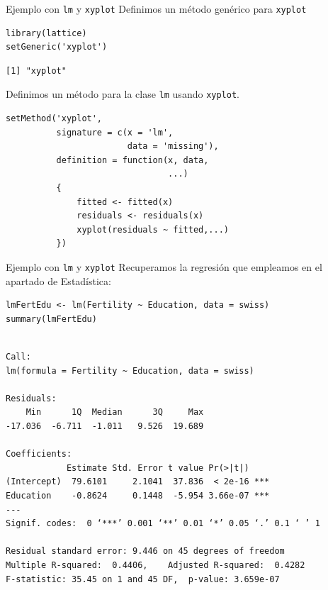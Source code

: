 \documentclass[xcolor={usenames,svgnames,dvipsnames}]{beamer}
\begin{document}
\begin{frame}[label={sec:org7fbee96},fragile]{Ejemplo con \texttt{lm} y \texttt{xyplot}}
 Definimos un método genérico para \texttt{xyplot}
\lstset{language=r,label= ,caption= ,captionpos=b,numbers=none}
\begin{lstlisting}
library(lattice)
setGeneric('xyplot')
\end{lstlisting}

\begin{verbatim}
[1] "xyplot"
\end{verbatim}


Definimos un método para la clase \texttt{lm} usando \texttt{xyplot}.
\lstset{language=r,label= ,caption= ,captionpos=b,numbers=none}
\begin{lstlisting}
setMethod('xyplot',
          signature = c(x = 'lm',
                        data = 'missing'),
          definition = function(x, data,
                                ...)
          {
              fitted <- fitted(x)
              residuals <- residuals(x)
              xyplot(residuals ~ fitted,...)
          })

\end{lstlisting}
\end{frame}

\begin{frame}[label={sec:org20745df},fragile]{Ejemplo con \texttt{lm} y \texttt{xyplot}}
 Recuperamos la regresión que empleamos en el apartado de Estadística:
\lstset{language=r,label= ,caption= ,captionpos=b,numbers=none}
\begin{lstlisting}
lmFertEdu <- lm(Fertility ~ Education, data = swiss)
summary(lmFertEdu)
\end{lstlisting}

\begin{verbatim}

Call:
lm(formula = Fertility ~ Education, data = swiss)

Residuals:
    Min      1Q  Median      3Q     Max 
-17.036  -6.711  -1.011   9.526  19.689 

Coefficients:
            Estimate Std. Error t value Pr(>|t|)    
(Intercept)  79.6101     2.1041  37.836  < 2e-16 ***
Education    -0.8624     0.1448  -5.954 3.66e-07 ***
---
Signif. codes:  0 ‘***’ 0.001 ‘**’ 0.01 ‘*’ 0.05 ‘.’ 0.1 ‘ ’ 1

Residual standard error: 9.446 on 45 degrees of freedom
Multiple R-squared:  0.4406,	Adjusted R-squared:  0.4282 
F-statistic: 35.45 on 1 and 45 DF,  p-value: 3.659e-07
\end{verbatim}
\end{frame}
\end{document}
